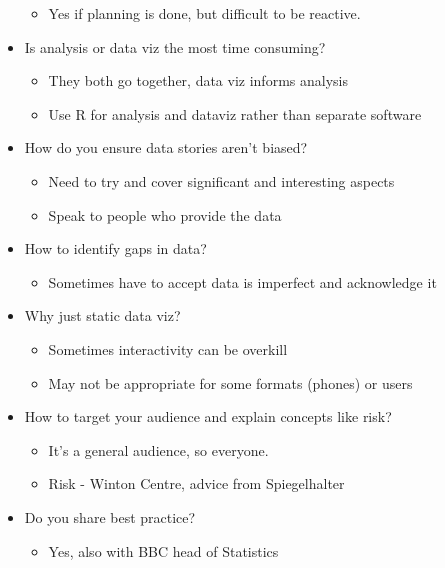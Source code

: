 \documentclass[
  letterpaper,
  DIV=11,
  numbers=noendperiod]{scrartcl}
\providecommand{\tightlist}{%
  \setlength{\itemsep}{0pt}\setlength{\parskip}{0pt}}
\begin{document}
\begin{itemize}
  \begin{itemize}
  \tightlist
  \item
    Yes if planning is done, but difficult to be reactive.
  \end{itemize}
\item
  Is analysis or data viz the most time consuming?

  \begin{itemize}
  \item
    They both go together, data viz informs analysis
  \item
    Use R for analysis and dataviz rather than separate software
  \end{itemize}
\item
  How do you ensure data stories aren't biased?

  \begin{itemize}
  \item
    Need to try and cover significant and interesting aspects
  \item
    Speak to people who provide the data
  \end{itemize}
\item
  How to identify gaps in data?

  \begin{itemize}
  \tightlist
  \item
    Sometimes have to accept data is imperfect and acknowledge it
  \end{itemize}
\item
  Why just static data viz?

  \begin{itemize}
  \item
    Sometimes interactivity can be overkill
  \item
    May not be appropriate for some formats (phones) or users
  \end{itemize}
\item
  How to target your audience and explain concepts like risk?

  \begin{itemize}
  \item
    It's a general audience, so everyone.
  \item
    Risk - Winton Centre, advice from Spiegelhalter
  \end{itemize}
\item
  Do you share best practice?

  \begin{itemize}
  \tightlist
  \item
    Yes, also with BBC head of Statistics
  \end{itemize}
\end{itemize}
\end{document}

